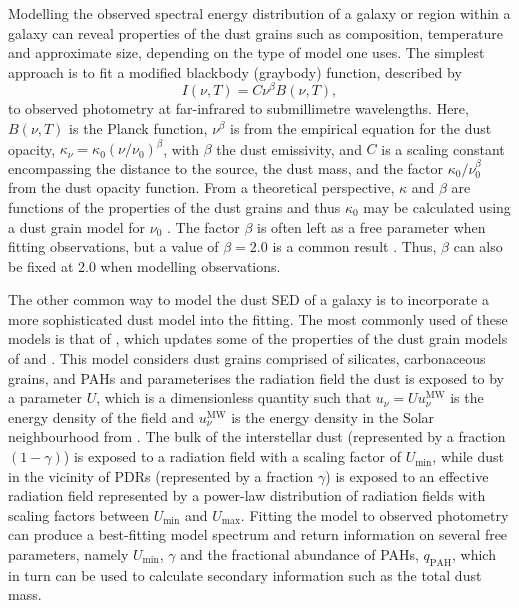 Modelling the observed spectral energy distribution of a galaxy or region within a galaxy can reveal properties of the dust grains such as composition, temperature and approximate size, depending on the type of model one uses.  The simplest approach is to fit a modified blackbody (graybody) function, described by
\begin{equation}\label{eqn:bb}
 I(\nu,T) = C\nu^{\beta}B(\nu,T),
\end{equation}
to observed photometry at far-infrared to submillimetre wavelengths.  Here, $B(\nu,T)$ is the Planck function, $\nu^{\beta}$ is from the empirical equation for the dust opacity, $\kappa_{\nu} = \kappa_{0}(\nu/\nu_{0})^{\beta}$, with $\beta$ the dust emissivity, and $C$ is a scaling constant encompassing the distance to the source, the dust mass, and the factor $\kappa_{0}/\nu_{0}^{\beta}$ from the dust opacity function.  From a theoretical perspective, $\kappa$ and $\beta$ are functions of the properties of the dust grains \citep[e.g.][]{1984ApJ...285...89D} and thus $\kappa_0$ may be calculated using a dust grain model for $\nu_0$ \citep{2001ApJ...554..778L}.  The factor $\beta$ is often left as a free parameter when fitting observations, but a value of $\beta=2.0$ is a common result \citep[e.g. ][]{1995ApJ...451..188R,2003AJ....125.2361B,2012A&A...540A..54B,2012MNRAS.421.2917F}.  Thus, $\beta$ can also be fixed at 2.0 when modelling observations.

The other common way to model the dust SED of a galaxy is to incorporate a more sophisticated dust model into the fitting.  The most commonly used of these models is that of \citet{2007ApJ...657..810D}, which updates some of the properties of the dust grain models of \citet{2001ApJ...554..778L} and \citet{2001ApJ...548..296W}.  This model considers dust grains comprised of silicates, carbonaceous grains, and PAHs and parameterises the radiation field the dust is exposed to by a parameter $U$, which is a dimensionless quantity such that $u_{\nu} = Uu_{\nu}^{\mathrm{MW}}$ is the energy density of the field and $u_{\nu}^{\mathrm{MW}}$ is the energy density in the Solar neighbourhood from \citet{1983A&A...128..212M}.  The bulk of the interstellar dust (represented by a fraction $(1-\gamma)$) is exposed to a radiation field with a scaling factor of $U_{\mathrm{min}}$, while dust in the vicinity of PDRs (represented by a fraction $\gamma$) is exposed to an effective radiation field represented by a power-law distribution of radiation fields with scaling factors between $U_{\mathrm{min}}$ and $U_{\mathrm{max}}$.  Fitting the model to observed photometry can produce a best-fitting model spectrum and return information on several free parameters, namely $U_{\mathrm{min}}$, $\gamma$ and the fractional abundance of PAHs, $q_{\mathrm{PAH}}$, which in turn can be used to calculate secondary information such as the total dust mass.


